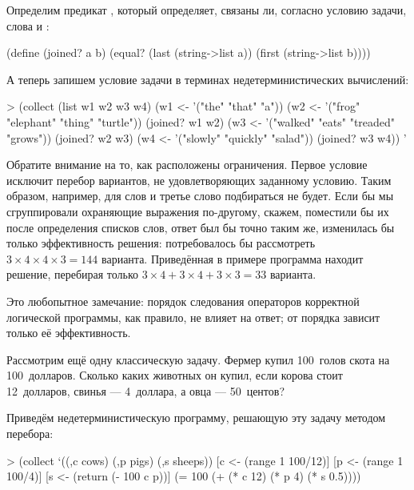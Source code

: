 Определим предикат , который определяет, связаны ли, согласно условию задачи, слова  и :
\begin{SchemeCode}[emph={a,b}]
(define (joined? a b)
  (equal? (last (string->list a)) 
          (first (string->list b))))
\end{SchemeCode}

А теперь запишем условие задачи в терминах недетерминистических вычислений:

\begin{SchemeCode}[emph={w1,w2,w3,w4}]
> (collect (list w1 w2 w3 w4)
    (w1 <- '("the" "that" "a"))
    (w2 <- '("frog" "elephant" "thing" "turtle"))
    (joined? w1 w2)
    (w3 <- '("walked" "eats" "treaded" "grows"))
    (joined? w2 w3)
    (w4 <- '("slowly" "quickly" "salad"))
    (joined? w3 w4))%
'%
\end{SchemeCode}

Обратите внимание на то, как расположены ограничения. Первое условие  исключит перебор вариантов, не удовлетворяющих заданному условию. Таким образом, например, для слов  и  третье слово подбираться не будет. Если бы мы сгруппировали охраняющие выражения по-другому, скажем, поместили бы их после определения списков слов, ответ был бы точно таким же, изменилась бы только эффективность решения: потребовалось бы рассмотреть $3\times4\times4\times3=144$ варианта. Приведённая в примере программа находит решение, перебирая только $3\times4+3\times4+3\times3=33$ варианта.

Это любопытное замечание: порядок следования операторов корректной логической программы, как правило, не влияет на ответ; от порядка зависит только её эффективность.

Рассмотрим ещё одну классическую задачу. Фермер купил 100~голов скота на 100~долларов. Сколько каких животных он купил, если корова стоит 12~долларов, свинья --- 4~доллара, а овца --- 50~центов?

Приведём недетерминистическую программу, решающую эту задачу методом перебора:

\begin{SchemeCode}[emph={c,p,s}]
   > (collect `((,c cows) (,p pigs) (,s sheeps))
      [c <- (range 1 100/12)]
      [p <- (range 1 100/4)]
      [s <- (return (- 100 c p))]
      (= 100 (+ (* c 12) (* p 4) (* s 0.5))))
\end{SchemeCode}

